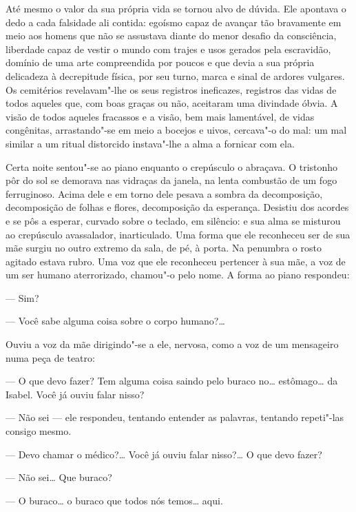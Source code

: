 Até mesmo o valor da sua própria vida se tornou alvo de dúvida.  Ele apontava o
dedo a cada falsidade ali contida: egoísmo capaz de avançar tão bravamente
em meio aos homens que não se assustava diante do menor desafio da consciência,
liberdade capaz de vestir o mundo com trajes e usos gerados pela
escravidão, domínio de uma arte compreendida por poucos e que devia a sua
própria delicadeza à decrepitude física, por seu turno, marca e sinal de
ardores vulgares.  Os cemitérios revelavam"-lhe os seus registros ineficazes,
\label{registros"-das} registros das vidas de todos aqueles que, com boas graças ou não, aceitaram
uma divindade óbvia.  A visão de todos aqueles fracassos e a visão, bem mais
lamentável, de vidas congênitas, arrastando"-se em meio a bocejos e uivos,
cercava"-o do mal: um mal similar a um ritual distorcido instava"-lhe a alma a
fornicar com ela.

Certa noite sentou"-se ao piano enquanto o crepúsculo o abraçava.
O tristonho pôr do sol se demorava nas vidraças da janela, na lenta combustão
de um fogo ferruginoso.  Acima dele e em torno dele pesava a sombra da
decomposição, decomposição de folhas e flores, decomposição da esperança.
Desistiu dos acordes e se pôs a esperar, curvado sobre o teclado, em silêncio:
e sua alma se misturou ao crepúsculo avassalador, inarticulado.  Uma forma que
ele reconheceu ser de sua mãe surgiu no outro extremo da sala, de pé, à porta.
Na penumbra o rosto agitado estava rubro.  Uma voz que ele reconheceu pertencer
à sua mãe, a voz de um ser humano aterrorizado, chamou"-o pelo nome.  A forma ao
piano respondeu:

--- Sim?

--- Você sabe alguma coisa sobre o corpo humano?\ldots{}

Ouviu a voz da mãe dirigindo"-se a ele, nervosa, como a voz de um mensageiro
numa peça de teatro:

--- O que devo fazer?  Tem alguma coisa saindo pelo buraco no\ldots{}  estômago\ldots{}
da Isabel.  Você já ouviu falar nisso?

--- Não sei --- ele respondeu, tentando entender as palavras, tentando
repeti"-las consigo mesmo.

--- Devo chamar o médico?\ldots{}  Você já ouviu falar nisso?\ldots{}  O que devo fazer?

--- Não sei\ldots{}  Que buraco?

--- O buraco\ldots{} o buraco que todos nós temos\ldots{} aqui.


